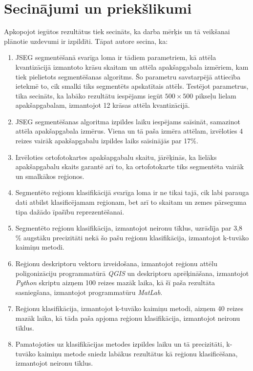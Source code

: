 \documentclass[12pt,paper=a4]{report}
\begin{document}
\chapter*{Secinājumi un priekšlikumi}
Apkopojot iegūtos rezultātus tiek secināts, ka darba mērķis un tā veikšanai plānotie uzdevumi ir izpildīti. Tāpat autore secina, ka:
\begin{enumerate}
\item JSEG segmentēšanā svarīga loma ir tādiem parametriem, kā attēla kvantizācijā izmantoto krāsu skaitam un attēla apakšapgabala izmēriem, kam tiek pielietots segmentēšanas algoritms. Šo parametru savstarpējā attiecība ietekmē to, cik smalki tiks segmentēts apskatītais attēls. Testējot parametrus, tika secināts, ka labāko rezultātu iespējams iegūt $500 \times 500$ pikseļu lielam apakšapgabalam, izmantojot 12 krāsas attēla kvantizācijā.
\item JSEG segmentēšanas algoritma izpildes laiku iespējams saīsināt, samazinot attēla apakšapgabala izmērus. Viena un tā paša izmēra attēlam, izvēloties 4 reizes vairāk apakšapgabalu izpildes laiks saīsinājās par 17\%.
\item Izvēloties ortofotokartes apakšapgabalu skaitu, jārēķinās, ka lielāks apakšapgabalu skaits garantē arī to, ka ortofotokarte tiks segmentēta vairāk un smalkākos reģionos.
\item Segmentēto reģionu klasifikācijā svarīga loma ir ne tikai tajā, cik labi parauga dati atbilst klasificējamam reģionam, bet arī to skaitam un zemes pārseguma tipa dažādo īpašību reprezentēšanai.
\item Segmentēto reģionu klasifikācija, izmantojot neironu tīklus, uzrādīja par 3,8 \% augstāku precizitāti nekā šo pašu reģionu klasifikācija, izmantojot k-tuvāko kaimiņu metodi.
\item Reģionu deskriptoru vektoru izveidošana, izmantojot reģionu attēlu poligonizāciju programmatūrā \textit{QGIS} un deskriptoru aprēķināšana, izmantojot \textit{Python} skriptu aizņem 100 reizes mazāk laika, kā šī paša rezultāta sasniegšana, izmantojot programmatūru \textit{MatLab}.
\item Reģionu klasifikācija, izmantojot k-tuvāko kaimiņu metodi, aizņem 40 reizes mazāk laika, kā tāda paša apjoma reģionu klasifikācija, izmantojot neironu tīklus. 
\item Pamatojoties uz klasifikācijas metodes izpildes laiku un tā precizitāti, k-tuvāko kaimiņu metode sniedz labākus rezultātus kā reģionu klasificēšana, izmantojot neironu tīklus.
\end{enumerate}\par
\end{document}
